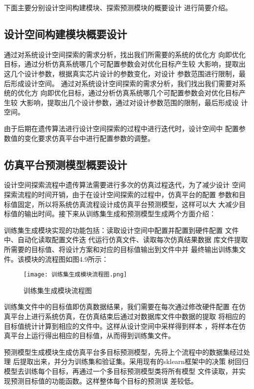 下面主要分别设计空间构建模块、探索预测模块的概要设计
进行简要介绍。

\subsection{设计空间构建模块概要设计}
通过对系统设计空间探索的需求分析，找出我们所需要的系统的优化方
向即优化目标，通过分析仿真系统哪几个可配置参数会对优化目标产生较
大影响，提取出这几个设计参数，根据真实芯片设计的参数变化，对设计
参数范围进行限制，最后形成设计空间。
通过对系统设计空间探索的需求分析，我们找出我们需要对系统的优化方
向即优化目标，通过分析仿真系统哪几个可配置参数会对优化目标产生较
大影响，提取出几个设计参数，通过对设计参数范围的限制，最后形成设
计空间。

由于后期在遗传算法进行设计空间探索的过程中进行迭代时，设计空间中
配置参数值的变化要求仿真平台中进行配置参数的调整。

\subsection{仿真平台预测模型概要设计}
设计空间探索流程中遗传算法需要进行多次的仿真过程迭代，为了减少设计
空间探索流程的时间开销，由于在设计空间探索的过程中，仿真平台的配置
参数和目标值固定，所以将系统仿真流程设计成仿真平台预测模型，这样可以大
大减少目标值的输出时间。接下来从训练集生成和预测模型生成两个方面介绍：

训练集生成模块实现的功能包括：读取设计空间中配置并配置到硬件配置
文件中、自动化读取配置文件迭  代运行仿真文件、读取每次仿真结果数据
库文件提取所需要的目标值、将设计方案和对应的目标值输出到文件中并
最终输出训练集文件。该模块的流程图如图4.9所示：

\begin{figure}[htb]
    \centering
    \texttt{[image: 训练集生成模块流程图.png]}
    \caption{训练集生成模块流程图}
    \label{fig:badge}
\end{figure}

训练集文件中的目标值即仿真数据结果，我们需要在每次通过修改硬件配置
在仿真平台上进行系统仿真，在仿真结束后通过对数据库文件中数据的提取
将相应的目标值统计计算到相应的文件中。这样从设计空间中采样得到样本
，将样本在仿真平台上运行得出相应的目标值，从而得到训练集文件。

预测模型生成模块生成仿真平台多目标预测模型，先将上个流程中的数据集经过处理
后提取出来，并分为训练集和验证集。采用现有的sklearn框架中的决策
树回归模型\cite{34}去训练每个目标，再通过一个多目标预测模型类将所有模型
文件读取，并实现预测目标值的功能函数。这样整体每个目标的预测误
差较低。

